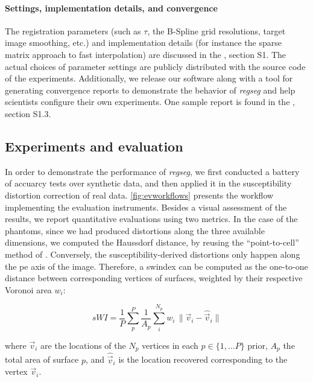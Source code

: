 \paragraph*{Settings, implementation details, and convergence}
\label{sec:conv_report}
The registration parameters (such as $\tau$, the B-Spline grid resolutions,
  target image smoothing, etc.) and implementation details (for instance the sparse matrix approach
  to fast interpolation) are discussed in the \suppl{}, section S1.
The actual choices of parameter settings are publicly distributed with the source code of the experiments.
Additionally, we release our software along with a tool for generating convergence reports to
  demonstrate the behavior of \emph{regseg} and help scientists configure their own experiments.
One sample report is found in the \suppl{}, section S1.3.


\subsection{Experiments and evaluation}
\label{sec:experiments_evaluation}
%
In order to demonstrate the performance of \emph{regseg}, we first conducted a battery of
  accuarcy tests over synthetic data, and then applied it in the susceptibility distortion
  correction of real data.
\autoref{fig:evworkflows} presents the workflow implementing the evaluation instruments.
Besides a visual assessment of the results, we report quantitative evaluations using
  two metrics.
In the case of the phantoms, since we had produced distortions along the three
  available dimensions, we computed the Haussdorf distance, by reusing the
  ``point-to-cell'' method of \cite{commandeur_vtk_2011}.
Conversely, the susceptibility-derived distortions only happen along the \gls*{pe}
  axis of the image.
Therefore, a \gls*{swindex} can be computed as the one-to-one distance between corresponding
  vertices of surfaces, weighted by their respective Voronoi area $w_i$:

  \begin{equation}
  sWI = \frac{1}{P} \sum\limits_p^P \frac{1}{A_p} \sum\limits_i^{N_p} w_i\,\|
  \vec{v}_i - \hat{\vec{v}}_i \|
  \label{eq:swindex}
  \end{equation}

  where $\vec{v}_i$ are the locations of the $N_p$ vertices in each $p \in \{1, \dots P\}$
  prior, $A_p$ the total area of surface $p$, and $\hat{\vec{v}}_i$ is the location
  recovered corresponding to the vertex $\vec{v}_i$.


